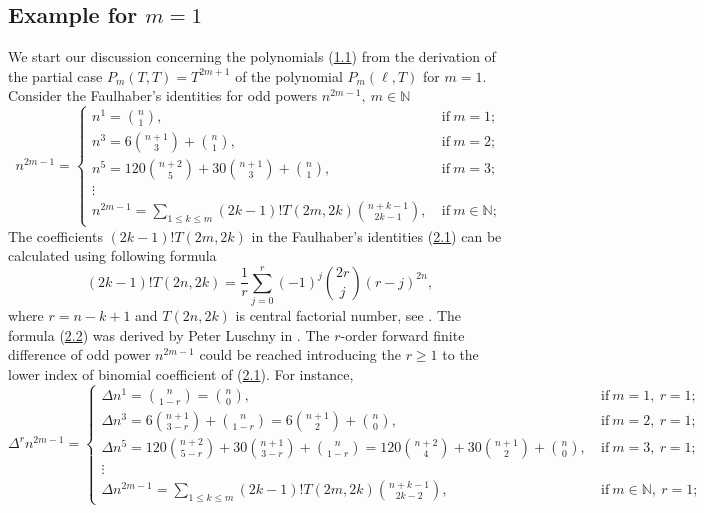 \documentclass[11pt, letterpaper]{amsart}
\theoremstyle{definition}
\theoremstyle{remark}
\numberwithin{equation}{section}
\begin{document}
\subsection{Example for \texorpdfstring{$m=1$}{m=1}}
We start our discussion concerning the polynomials (\hyperref[f1]{1.1}) from the derivation of the partial case $P_m(T,T)=T^{2m+1}$ of the polynomial $P_m(\ell,T)$ for $m=1$. Consider the Faulhaber's identities \cite{1} for odd powers $n^{2m-1}, \ m\in\mathbb{N}$
\begin{equation}\label{knuth1}
n^{2m-1}=\begin{cases}
n^1 = \binom{n}{1}, \ &\mathrm{if} \ m=1;\\
n^3 = 6\binom{n+1}{3}+\binom{n}{1}, \ &\mathrm{if} \ m=2;\\
n^5 = 120\binom{n+2}{5}+30\binom{n+1}{3}+\binom{n}{1}, \ &\mathrm{if} \ m=3;\\
\vdots\\
n^{2m-1} = \sum\limits_{1\leq k\leq m}(2k-1)!T(2m,2k)\binom{n+k-1}{2k-1}, \ &\mathrm{if} \ m\in\mathbb{N};
\end{cases}
\end{equation}
The coefficients $(2k-1)!T(2m,2k)$ in the Faulhaber's identities (\hyperref[knuth1]{2.1}) can be calculated using following formula
\begin{equation}\label{knuth2}
(2k-1)!T(2n,2k)=\frac{1}{r}\sum_{j=0}^{r}(-1)^j\binom{2r}{j}(r-j)^{2n},
\end{equation}
where $r=n-k+1$ and $T(2n,2k)$ is central factorial number, see \cite{22}. The formula (\hyperref[knuth2]{2.2}) was derived by Peter Luschny in \cite{27}. The $r$-order forward finite difference of odd power $n^{2m-1}$ could be reached introducing the $r\geq 1$ to the lower index of binomial coefficient of (\hyperref[knuth1]{2.1}). For instance,
\begin{equation}\label{forward_diff_identity}
\Delta^r n^{2m-1}=
\begin{cases}
\Delta n^1 = \binom{n}{1-r}=\binom{n}{0}, \ &\mathrm{if} \ m=1, \ r=1;\\
\Delta n^3 = 6\binom{n+1}{3-r}+\binom{n}{1-r}=6\binom{n+1}{2}+\binom{n}{0}, \ &\mathrm{if} \ m=2, \ r=1;\\
\Delta n^5 = 120\binom{n+2}{5-r}+30\binom{n+1}{3-r}+\binom{n}{1-r}=120\binom{n+2}{4}+30\binom{n+1}{2}+\binom{n}{0}, \ &\mathrm{if} \ m=3, \ r=1;\\
\vdots\\
\Delta n^{2m-1} =\sum\limits_{1\leq k\leq m}(2k-1)!T(2m,2k)\binom{n+k-1}{2k-2}, \ &\mathrm{if} \ m\in\mathbb{N}, \ r=1;
\end{cases}
\end{equation}
\end{document}

